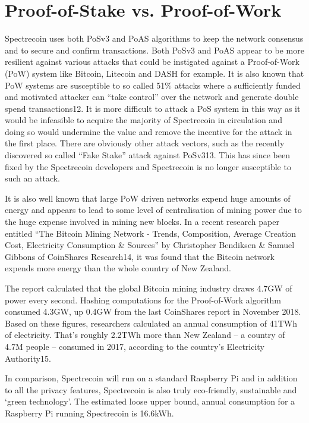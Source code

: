 \section{Proof-of-Stake vs. Proof-of-Work}
Spectrecoin uses both PoSv3 and PoAS algorithms to keep the network consensus and to secure and confirm transactions. Both PoSv3 and PoAS appear to be more resilient against various attacks that could be instigated against a Proof-of-Work (PoW) system like Bitcoin, Litecoin and DASH for example. It is also known that PoW systems are susceptible to so called 51\% attacks where a sufficiently funded and motivated attacker can “take control” over the network and generate double spend transactions12. It is more difficult to attack a PoS system in this way as it would be infeasible to acquire the majority of Spectrecoin in circulation and doing so would undermine the value and remove the incentive for the attack in the first place. There are obviously other attack vectors, such as the recently discovered so called “Fake Stake” attack against PoSv313. This has since been fixed by the Spectrecoin developers and Spectrecoin is no longer susceptible to such an attack. 

 

It is also well known that large PoW driven networks expend huge amounts of energy and appears to lead to some level of centralisation of mining power due to the huge expense involved in mining new blocks. In a recent research paper entitled “The Bitcoin Mining Network - Trends, Composition, Average Creation Cost, Electricity Consumption \& Sources” by Christopher Bendiksen \& Samuel Gibbons of CoinShares Research14, it was found that the Bitcoin network expends more energy than the whole country of New 
Zealand. 

 

The report calculated that the global Bitcoin mining industry draws 4.7GW of power every second. Hashing computations for the Proof-of-Work algorithm consumed 4.3GW, up 0.4GW from the last CoinShares report in November 2018. Based on these figures, researchers calculated an annual consumption of 41TWh of electricity. That’s roughly 2.2TWh more than New Zealand – a country of 4.7M people – consumed in 2017, according to the country’s Electricity Authority15. 

 

In comparison, Spectrecoin will run on a standard Raspberry Pi and in addition to all the privacy features, Spectrecoin is also truly eco-friendly, sustainable and ‘green technology’. The estimated loose upper bound, annual consumption for a Raspberry Pi running Spectrecoin is 16.6kWh. 

